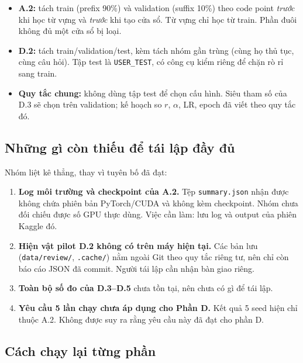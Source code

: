 \begin{itemize}[leftmargin=2em]
\item \textbf{A.2:} tách train (prefix 90\%) và validation (suffix 10\%) theo code
point \emph{trước} khi học từ vựng và \emph{trước} khi tạo cửa sổ. Từ vựng chỉ học
từ train. Phần đuôi không đủ một cửa sổ bị loại.
\item \textbf{D.2:} tách train/validation/test, kèm tách nhóm gần trùng (cùng họ
thủ tục, cùng câu hỏi). Tập test là \texttt{USER\_TEST}, có công cụ kiểm riêng để
chặn rò rỉ sang train.
\item \textbf{Quy tắc chung:} không dùng tập test để chọn cấu hình. Siêu tham số
của D.3 sẽ chọn trên validation; kế hoạch so $r$, $\alpha$, LR, epoch đã viết theo
quy tắc đó.
\end{itemize}

\subsection{Những gì còn thiếu để tái lập đầy đủ \chualam}

Nhóm liệt kê thẳng, thay vì tuyên bố đã đạt:

\begin{enumerate}[leftmargin=2em]
\item \textbf{Log môi trường và checkpoint của A.2.} Tệp \texttt{summary.json}
nhận được không chứa phiên bản PyTorch/CUDA và không kèm checkpoint. Nhóm chưa đối
chiếu được số GPU thực dùng. Việc cần làm: lưu log và output của phiên Kaggle đó.
\item \textbf{Hiện vật pilot D.2 không có trên máy hiện tại.} Các bản lưu
(\texttt{data/review/}, \texttt{.cache/}) nằm ngoài Git theo quy tắc riêng tư, nên
chỉ còn báo cáo JSON đã commit. Người tái lập cần nhận bàn giao riêng.
\item \textbf{Toàn bộ số đo của D.3--D.5} chưa tồn tại, nên chưa có gì để tái lập.
\item \textbf{Yêu cầu 5 lần chạy chưa áp dụng cho Phần D.} Kết quả 5 seed hiện chỉ
thuộc A.2. Không được suy ra rằng yêu cầu này đã đạt cho phần D.
\end{enumerate}

\subsection{Cách chạy lại từng phần}

